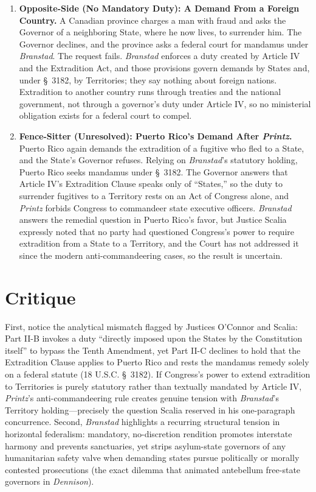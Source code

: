 \documentclass[12pt]{article}
\begin{document}
\begin{enumerate}
\item \textbf{Opposite-Side (No Mandatory Duty): A Demand From a Foreign Country.} A Canadian province charges a man with fraud and asks the Governor of a neighboring State, where he now lives, to surrender him. The Governor declines, and the province asks a federal court for mandamus under \emph{Branstad}. The request fails. \emph{Branstad} enforces a duty created by Article IV and the Extradition Act, and those provisions govern demands by States and, under \S~3182, by Territories; they say nothing about foreign nations. Extradition to another country runs through treaties and the national government, not through a governor's duty under Article IV, so no ministerial obligation exists for a federal court to compel.

\item \textbf{Fence-Sitter (Unresolved): Puerto Rico's Demand After \emph{Printz}.} Puerto Rico again demands the extradition of a fugitive who fled to a State, and the State's Governor refuses. Relying on \emph{Branstad}'s statutory holding, Puerto Rico seeks mandamus under \S~3182. The Governor answers that Article IV's Extradition Clause speaks only of ``States,'' so the duty to surrender fugitives to a Territory rests on an Act of Congress alone, and \emph{Printz} forbids Congress to commandeer state executive officers. \emph{Branstad} answers the remedial question in Puerto Rico's favor, but Justice Scalia expressly noted that no party had questioned Congress's power to require extradition from a State to a Territory, and the Court has not addressed it since the modern anti-commandeering cases, so the result is uncertain.

\end{enumerate}

\section{Critique}
First, notice the analytical mismatch flagged by Justices O'Connor and Scalia: Part II-B invokes a duty ``directly imposed upon the States by the Constitution itself'' to bypass the Tenth Amendment, yet Part II-C declines to hold that the Extradition Clause applies to Puerto Rico and rests the mandamus remedy solely on a federal statute (18 U.S.C. \S~3182). If Congress's power to extend extradition to Territories is purely statutory rather than textually mandated by Article IV, \emph{Printz}'s anti-commandeering rule creates genuine tension with \emph{Branstad}'s Territory holding---precisely the question Scalia reserved in his one-paragraph concurrence. Second, \emph{Branstad} highlights a recurring structural tension in horizontal federalism: mandatory, no-discretion rendition promotes interstate harmony and prevents sanctuaries, yet strips asylum-state governors of any humanitarian safety valve when demanding states pursue politically or morally contested prosecutions (the exact dilemma that animated antebellum free-state governors in \emph{Dennison}).
\end{document}
